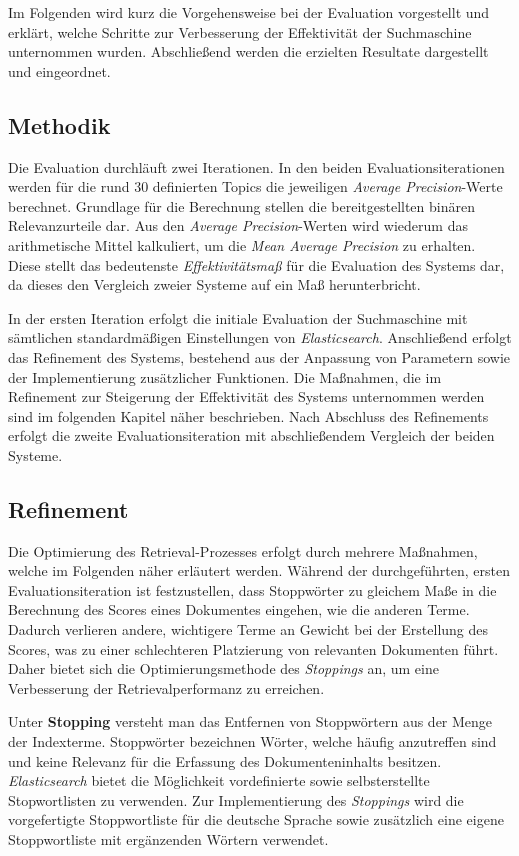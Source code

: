 \documentclass[11pt,a4paper, halfparskip]{scrartcl}
\begin{document}
Im Folgenden wird kurz die Vorgehensweise bei der Evaluation vorgestellt und erklärt, welche Schritte zur Verbesserung der Effektivität der Suchmaschine unternommen wurden.
Abschließend werden die erzielten Resultate dargestellt und eingeordnet.

\subsection{Methodik}

Die Evaluation durchläuft zwei Iterationen.
In den beiden Evaluationsiterationen werden für die rund 30 definierten Topics die jeweiligen \textit{Average Precision}-Werte berechnet. 
Grundlage für die Berechnung stellen die bereitgestellten binären Relevanzurteile dar.
Aus den \textit{Average Precision}-Werten wird wiederum das arithmetische Mittel kalkuliert, um die \textit{Mean Average Precision} zu erhalten.
Diese stellt das bedeutenste \textit{Effektivitätsmaß} für die Evaluation des Systems dar, da dieses den Vergleich zweier Systeme auf ein Maß herunterbricht.

In der ersten Iteration erfolgt die initiale Evaluation der Suchmaschine mit sämtlichen standardmäßigen Einstellungen von \textit{Elasticsearch}.
Anschließend erfolgt das Refinement des Systems, bestehend aus der Anpassung von Parametern sowie der Implementierung zusätzlicher Funktionen. 
Die Maßnahmen, die im Refinement zur Steigerung der Effektivität des Systems unternommen werden sind im folgenden Kapitel näher beschrieben. 
Nach Abschluss des Refinements erfolgt die zweite Evaluationsiteration mit abschließendem Vergleich der beiden Systeme. 

\subsection{Refinement}

Die Optimierung des Retrieval-Prozesses erfolgt durch mehrere Maßnahmen, welche im Folgenden näher erläutert werden.
Während der durchgeführten, ersten Evaluationsiteration ist festzustellen, dass Stoppwörter zu gleichem Maße in die Berechnung des Scores eines Dokumentes eingehen, wie die anderen Terme.
Dadurch verlieren andere, wichtigere Terme an Gewicht bei der Erstellung des Scores, was zu einer schlechteren Platzierung von relevanten Dokumenten führt.
Daher bietet sich die Optimierungsmethode des \textit{Stoppings} an, um eine Verbesserung der Retrievalperformanz zu erreichen.

Unter \textbf{Stopping} versteht man das Entfernen von Stoppwörtern aus der Menge der Indexterme.
Stoppwörter bezeichnen Wörter, welche häufig anzutreffen sind und keine Relevanz für die Erfassung des Dokumenteninhalts besitzen.
\textit{Elasticsearch} bietet die Möglichkeit vordefinierte sowie selbsterstellte Stopwortlisten zu verwenden.
Zur Implementierung des \textit{Stoppings} wird die vorgefertigte Stoppwortliste für die deutsche Sprache sowie zusätzlich eine eigene Stoppwortliste mit ergänzenden Wörtern verwendet. 
\end{document}
